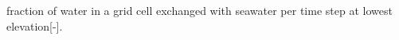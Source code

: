 fraction of water in a grid cell exchanged with seawater per time step at lowest elevation\mbox{[}-\/\mbox{]}. 